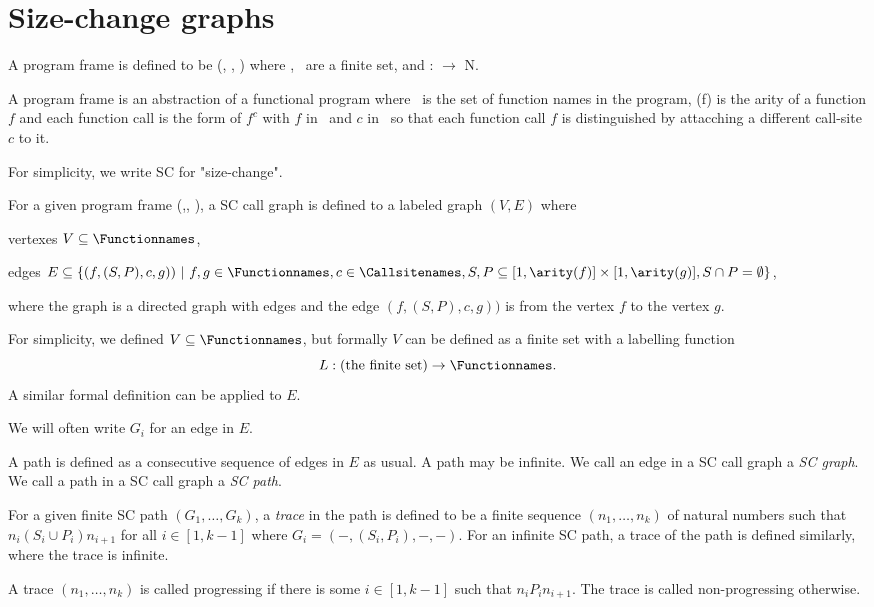 \section{Size-change graphs}

\begin{Def}\rm
A program frame is defined to be (\Functionnames, \Callsitenames, \arity)
where
\Functionnames, \Callsitenames\ are a finite set,
and \arity : \Functionnames $\to$ N.
\end{Def}

A program frame is an abstraction of a functional program
where \Functionnames\ is the set of function names in the program,
\arity(f) is the arity of a function $f$
and each function call is the form of $f^c$
with $f$ in \Functionnames\ and $c$ in \Callsitenames\
so that each function call $f$ is 
distinguished by
attacching a different call-site $c$ to it.

For simplicity, we write SC for "size-change".

\begin{Def}[SC call graph]\rm
For a given program frame (\Functionnames,\Callsitenames, \arity),
a SC call graph is defined to a labeled graph $(V,E)$ where

vertexes $V \subseteq \Functionnames$,

edges $E \subseteq \{(f, (S, P), c, g)) \ |\ 
f,g \in \Functionnames, c \in \Callsitenames,
S, P \subseteq [1,\arity(f)] \times [1,\arity(g)],
S \cap P = \emptyset \}$,

where the graph is a directed graph with edges and
the edge $(f, (S, P), c, g))$ is from the vertex $f$ to the vertex $g$.

For simplicity, we defined $V \subseteq \Functionnames$, but
formally $V$ 
can be defined as a finite set 
with a labelling function
\[
L : \hbox{(the finite set)} \to \Functionnames.
\]
A similar formal definition can be applied to $E$.

We will often write $G_i$ for an edge in $E$.

A path is defined as a consecutive sequence of edges in $E$ as usual.
A path may be infinite.
We call an edge in a SC call graph a {\em SC graph}.
We call a path in a SC call graph a {\em SC path}.

For a given finite SC path $(G_1,\ldots,G_k)$,
a {\em trace} in the path is defined to be
a finite sequence $(n_1,\ldots,n_k)$ of natural numbers such that
$n_i (S_i \cup P_i) n_{i+1}$ for all $i \in [1,k-1]$
where $G_i = (-,(S_i,P_i),-,-)$.
For an infinite SC path,
a trace of the path is defined similarly,
where the trace is infinite.

A trace $(n_1,\ldots,n_k)$ is called progressing
if there is some $i \in [1,k-1]$ such that
$n_i P_i n_{i+1}$.
The trace is called non-progressing otherwise.
\end{Def}

